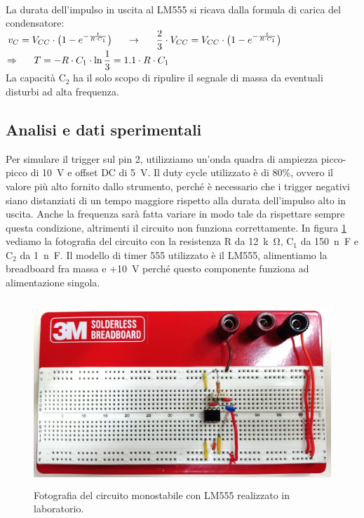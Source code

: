 \documentclass{report}
\begin{document}
\\La durata dell'impulso in uscita al LM555 si ricava dalla formula di carica del condensatore: 
\\[4pt]\indent$\displaystyle{v_C=V_{CC}\cdot\bigl(1-e^{-\frac{t}{R\cdot C_1}}\bigr)\indent\rightarrow\indent\frac{2}{3}\cdot V_{CC}=V_{CC}\cdot\bigl(1-e^{-\frac{t}{R\cdot C_1}}\bigr)}$
\\[4pt]\indent$\displaystyle{\Rightarrow\indent T=-R\cdot C_1\cdot\ln\frac{1}{3}=1.1\cdot R\cdot C_1}$
\\[4pt]La capacità $\mathrm{C_2}$ ha il solo scopo di ripulire il segnale di massa da eventuali disturbi ad alta frequenza.
\subsection{Analisi e dati sperimentali}
Per simulare il trigger sul pin 2, utilizziamo un'onda quadra di ampiezza picco-picco di \SI{10}{\volt} e offset DC di \SI{5}{\volt}. Il duty cycle utilizzato è di 80\%, ovvero il valore più alto fornito dallo strumento, perché è necessario che i trigger negativi siano distanziati di un tempo maggiore rispetto alla durata dell'impulso alto in uscita. Anche la frequenza sarà fatta variare in modo tale da rispettare sempre questa condizione, altrimenti il circuito non funziona correttamente. In figura \ref{figura:circuito2} vediamo la fotografia del circuito con la resistenza R da \SI{12}{k\ohm}, $\mathrm{C_1}$ da  \SI{150}{n\farad} e $\mathrm{C_2}$ da  \SI{1}{n\farad}. Il modello di timer 555 utilizzato è il LM555, alimentiamo la breadboard fra massa e +\SI{10}{\volt} perché questo componente funziona ad alimentazione singola.
\begin{figure}[h!]
	\centering
	\includegraphics[height=7cm]{immagini/circuito2}
	\caption{Fotografia del circuito monostabile con LM555 realizzato in laboratorio.}
	\label{figura:circuito2}
\end{figure}
\end{document}

